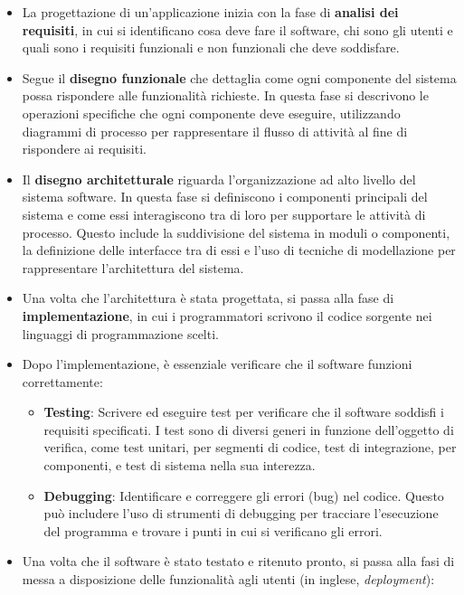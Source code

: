 \documentclass[
  letterpaper,
]{scrbook}
\begin{document}
\begin{itemize}
\item
  La progettazione di un'applicazione inizia con la fase di
  \textbf{analisi dei requisiti}, in cui si identificano cosa deve fare
  il software, chi sono gli utenti e quali sono i requisiti funzionali e
  non funzionali che deve soddisfare.
\item
  Segue il \textbf{disegno funzionale} che dettaglia come ogni
  componente del sistema possa rispondere alle funzionalità richieste.
  In questa fase si descrivono le operazioni specifiche che ogni
  componente deve eseguire, utilizzando diagrammi di processo per
  rappresentare il flusso di attività al fine di rispondere ai
  requisiti.
\item
  Il \textbf{disegno architetturale} riguarda l'organizzazione ad alto
  livello del sistema software. In questa fase si definiscono i
  componenti principali del sistema e come essi interagiscono tra di
  loro per supportare le attività di processo. Questo include la
  suddivisione del sistema in moduli o componenti, la definizione delle
  interfacce tra di essi e l'uso di tecniche di modellazione per
  rappresentare l'architettura del sistema.
\item
  Una volta che l'architettura è stata progettata, si passa alla fase di
  \textbf{implementazione}, in cui i programmatori scrivono il codice
  sorgente nei linguaggi di programmazione scelti.
\item
  Dopo l'implementazione, è essenziale verificare che il software
  funzioni correttamente:

  \begin{itemize}
  \item
    \textbf{Testing}: Scrivere ed eseguire test per verificare che il
    software soddisfi i requisiti specificati. I test sono di diversi
    generi in funzione dell'oggetto di verifica, come test unitari, per
    segmenti di codice, test di integrazione, per componenti, e test di
    sistema nella sua interezza.
  \item
    \textbf{Debugging}: Identificare e correggere gli errori (bug) nel
    codice. Questo può includere l'uso di strumenti di debugging per
    tracciare l'esecuzione del programma e trovare i punti in cui si
    verificano gli errori.
  \end{itemize}
\item
  Una volta che il software è stato testato e ritenuto pronto, si passa
  alla fasi di messa a disposizione delle funzionalità agli utenti (in
  inglese, \emph{deployment}):


\end{itemize}
\end{document}
